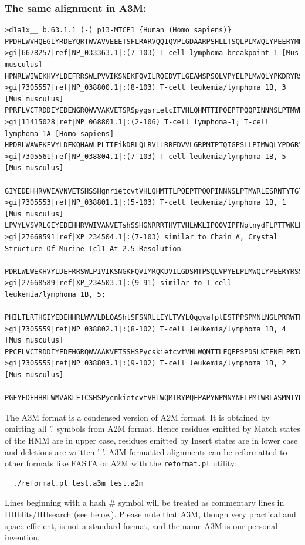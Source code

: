 \documentclass[11pt,a4paper]{article}
\begin{document}
\subsubsection*{The same alignment in A3M:}

\scriptsize\begin{verbatim}
>d1a1x__ b.63.1.1 (-) p13-MTCP1 {Human (Homo sapiens)}
PPDHLWVHQEGIYRDEYQRTWVAVVEEETSFLRARVQQIQVPLGDAARPSHLLTSQLPLMWQLYPEERYMDNNSR
>gi|6678257|ref|NP_033363.1|:(7-103) T-cell lymphoma breakpoint 1 [Mus musculus]
HPNRLWIWEKHVYLDEFRRSWLPVVIKSNEKFQVILRQEDVTLGEAMSPSQLVPYELPLMWQLYPKDRYRSCDSM
>gi|7305557|ref|NP_038800.1|:(8-103) T-cell leukemia/lymphoma 1B, 3 [Mus musculus]
PPRFLVCTRDDIYEDENGRQWVVAKVETSRSpygsrietcITVHLQHMTTIPQEPTPQQPINNNSLPTMWRLESMNTYTGTDGT
>gi|11415028|ref|NP_068801.1|:(2-106) T-cell lymphoma-1; T-cell lymphoma-1A [Homo sapiens]
HPDRLWAWEKFVYLDEKQHAWLPLTIEikDRLQLRVLLRREDVVLGRPMTPTQIGPSLLPIMWQLYPDGRYRSSDSS
>gi|7305561|ref|NP_038804.1|:(7-103) T-cell leukemia/lymphoma 1B, 5 [Mus musculus]
----------GIYEDEHHRVWIAVNVETSHSSHgnrietcvtVHLQHMTTLPQEPTPQQPINNNSLPTMWRLESRNTYTGTDGT
>gi|7305553|ref|NP_038801.1|:(5-103) T-cell leukemia/lymphoma 1B, 1 [Mus musculus]
LPVYLVSVRLGIYEDEHHRVWIVANVETshSSHGNRRRTHVTVHLWKLIPQQVIPFNplnydFLPTTWKLESRNIYWATDGT
>gi|27668591|ref|XP_234504.1|:(7-103) similar to Chain A, Crystal Structure Of Murine Tcl1 At 2.5 Resolution
-PDRLWLWEKHVYLDEFRRSWLPIVIKSNGKFQVIMRQKDVILGDSMTPSQLVPYELPLMWQLYPEERYRSSNSE
>gi|27668589|ref|XP_234503.1|:(9-91) similar to T-cell leukemia/lymphoma 1B, 5;
-PHILTLRTHGIYEDEHHRLWVVLDLQAShlSFSNRLLIYLTVYLQqgvafplESTPPSPMNLNGLPRRWTLRTMGTYEGTDNT
>gi|7305559|ref|NP_038802.1|:(8-102) T-cell leukemia/lymphoma 1B, 4 [Mus musculus] 
PPCFLVCTRDDIYEDEHGRQWVAAKVETSSHSPycskietcvtVHLWQMTTLFQEPSPDSLKTFNFLPRTWRLESRNTYRGADAM
>gi|7305555|ref|NP_038803.1|:(9-102) T-cell leukemia/lymphoma 1B, 2 [Mus musculus]
---------PGFYEDEHHRLWMVAKLETCSHSPycnkietcvtVHLWQMTRYPQEPAPYNPMNYNFLPMTWRLASMNTYRGTDAM
\end{verbatim}\normalsize

The A3M format is a condensed version of A2M format. It is obtained by omitting all '.' 
symbols from A2M format. Hence residues emitted by Match states of the HMM are in upper 
case, residues emitted by Insert states are in lower case and deletions are written '-'.
A3M-formatted alignments can be reformatted to other formats like FASTA or A2M with 
the \verb`reformat.pl` utility:
\begin{verbatim}
  ./reformat.pl test.a3m test.a2m
\end{verbatim}
Lines beginning with a hash \# symbol will be treated as commentary lines in HHblits/HHsearch 
(see below). Please note that A3M, though very practical and space-efficient, 
is not a standard format, and the name A3M is our personal invention.
\end{document}
